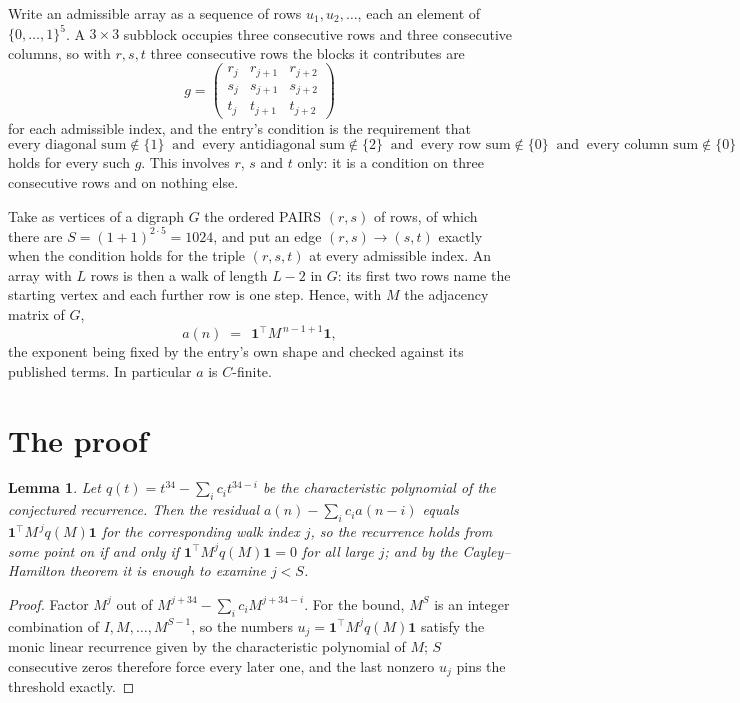 \documentclass[11pt,a4paper]{article}
\theoremstyle{plain}
\newtheorem{lemma}[theorem]{Lemma}
\theoremstyle{definition}
\begin{document}
Write an admissible array as a sequence of rows $u_1,u_2,\dots$, each an element of
$\{0,\dots,1\}^{5}$. A $3\times3$ subblock occupies three consecutive rows and
three consecutive columns, so with $r,s,t$ three consecutive rows the blocks it
contributes are
\[
g=\begin{pmatrix}r_j&r_{j+1}&r_{j+2}\\ s_j&s_{j+1}&s_{j+2}\\ t_j&t_{j+1}&t_{j+2}\end{pmatrix}
\]
for each admissible index, and the entry's condition is the requirement that
\[
\text{every diagonal sum} \notin \{1\}\ \text{ and }\ \text{every antidiagonal sum} \notin \{2\}\ \text{ and }\ \text{every row sum} \notin \{0\}\ \text{ and }\ \text{every column sum} \notin \{0\}
\]
holds for every such $g$. This involves $r$, $s$ and $t$ only: it is a condition on
three consecutive rows and on nothing else.

Take as vertices of a digraph $G$ the ordered PAIRS $(r,s)$ of rows, of which there are
$S=(1+1)^{2\cdot5}=1024$, and put an edge $(r,s)\to(s,t)$ exactly when the condition
holds for the triple $(r,s,t)$ at every admissible index. An array with $L$ rows is then a
walk of length $L-2$ in $G$: its first two rows name the starting vertex and each further
row is one step. Hence, with $M$ the adjacency matrix of $G$,
\[
a(n)\;=\;\,\mathbf{1}^{\!\top}M^{\,n-1+1}\mathbf{1},
\]
the exponent being fixed by the entry's own shape and checked against its published terms.
In particular $a$ is $C$-finite.

\section{The proof}

\begin{lemma}\label{lem:crit}
Let $q(t)=t^{34}-\sum_i c_it^{34-i}$ be the characteristic polynomial of the
conjectured recurrence. Then the residual $a(n)-\sum_ic_ia(n-i)$ equals
$\mathbf{1}^{\!\top}M^{\,j}q(M)\mathbf{1}$ for the corresponding walk index
$j$, so the recurrence holds from some point on if and only if
$\mathbf{1}^{\!\top}M^{j}q(M)\mathbf{1}=0$ for all large $j$; and by the
Cayley--Hamilton theorem it is enough to examine $j<S$.
\end{lemma}

\begin{proof}
Factor $M^{j}$ out of $M^{j+34}-\sum_ic_iM^{j+34-i}$. For the bound, $M^{S}$
is an integer combination of $I,M,\dots,M^{S-1}$, so the numbers
$u_j=\mathbf{1}^{\!\top}M^{j}q(M)\mathbf{1}$ satisfy the monic linear recurrence given by
the characteristic polynomial of $M$; $S$ consecutive zeros therefore force every later one,
and the last nonzero $u_j$ pins the threshold exactly.
\end{proof}
\end{document}
